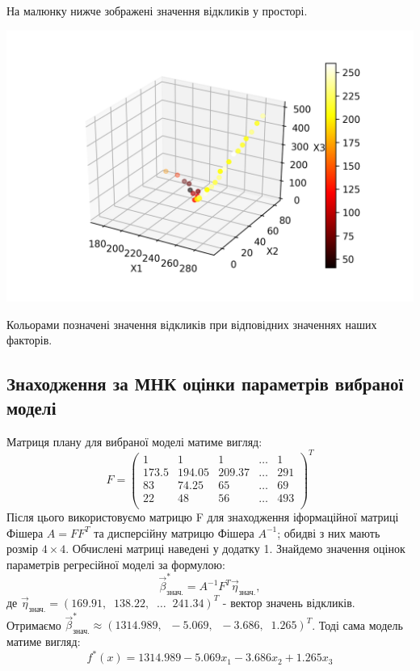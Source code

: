 \documentclass{article}
\begin{document}
      \newpage
      На малюнку нижче зображені значення відкликів у просторі.
      \begin{center}
        \includegraphics[scale=0.8]{task3_data.png}
      \end{center}
      Кольорами позначені значення відкликів при відповідних значеннях наших факторів.
      \newpage
    \subsection{Знаходження за МНК оцінки параметрів вибраної моделі}
      Матриця плану для вибраної моделі матиме вигляд:
      \begin{equation}
        F = 
        \begin{pmatrix}
          1 & 1 & 1 & \dots & 1 \\
          173.5 & 194.05 & 209.37 & \dots & 291 \\
          83 & 74.25 & 65 & \dots & 69 \\
          22 & 48 & 56 & \dots & 493 \\
        \end{pmatrix}^T
      \end{equation}
      Після цього використовуємо матрицю F для знаходження іформаційної матриці 
      Фішера $A = FF^T $ та дисперсійну матрицю Фішера $A^{-1}$; обидві з них мають 
      розмір $4 \times 4$.
      Обчислені матриці наведені у додатку 1.
      Знайдемо значення оцінок параметрів регресійної моделі за формулою:
      \begin{equation}
        \vec{\beta}^*_{\text{знач.}} = A^{-1}F^T\vec{\eta}_\text{знач.},
      \end{equation}
      де $\vec{\eta}_\text{знач.} = (169.91, \;\; 138.22, \;\; \dots \;\; 241.34)^T$ - вектор значень 
      відкликів.
      Отримаємо $\vec{\beta}^*_{\text{знач.}} \approx (1314.989, \;\; -5.069, \;\; -3.686, \;\; 1.265)^T$.
      Тоді сама модель матиме вигляд:
      \begin{equation}
        f^*(x) = 1314.989 -5.069 x_1 -3.686 x_2 + 1.265 x_3
      \end{equation}
\end{document}
